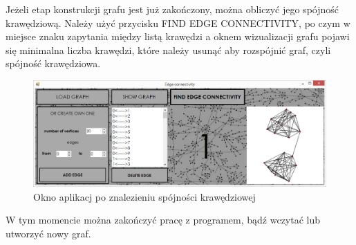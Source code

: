 \documentclass{article}
\begin{document}
Jeżeli etap konstrukcji grafu jest już zakończony, można obliczyć jego spójność krawędziową. Należy użyć przycisku FIND EDGE CONNECTIVITY, po czym w miejsce znaku zapytania między listą krawędzi a oknem wizualizacji grafu pojawi się minimalna liczba krawędzi, które należy usunąć aby rozspójnić graf, czyli spójność krawędziowa.
 
\begin{figure}[h]
\centering
\includegraphics[scale=0.4]{04}
\caption{Okno aplikacj po znalezieniu spójności krawędziowej}
\end{figure}

W tym momencie można zakończyć pracę z programem, bądź wczytać lub utworzyć nowy graf.
\end{document}
